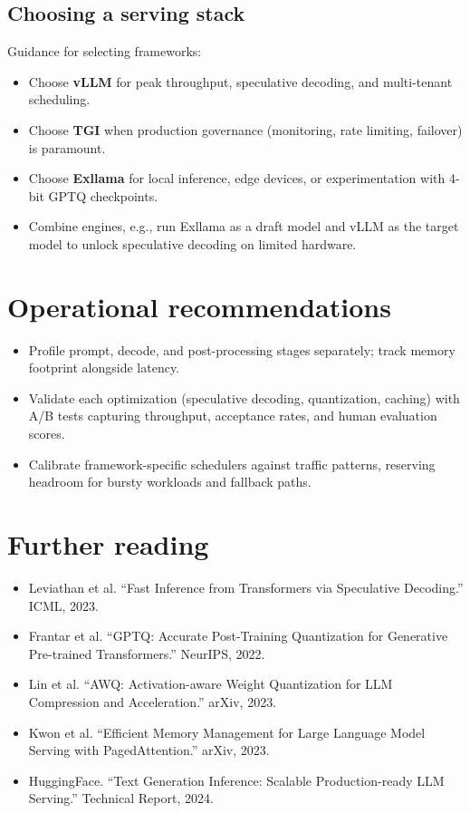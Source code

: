 \documentclass{article}
\begin{document}
\subsection{Choosing a serving stack}
Guidance for selecting frameworks:
\begin{itemize}
  \item Choose \textbf{vLLM} for peak throughput, speculative decoding, and multi-tenant scheduling.
  \item Choose \textbf{TGI} when production governance (monitoring, rate limiting, failover) is paramount.
  \item Choose \textbf{Exllama} for local inference, edge devices, or experimentation with 4-bit GPTQ checkpoints.
  \item Combine engines, e.g., run Exllama as a draft model and vLLM as the target model to unlock speculative decoding on limited hardware.
\end{itemize}

\section*{Operational recommendations}
\begin{itemize}
  \item Profile prompt, decode, and post-processing stages separately; track memory footprint alongside latency.
  \item Validate each optimization (speculative decoding, quantization, caching) with A/B tests capturing throughput, acceptance rates, and human evaluation scores.
  \item Calibrate framework-specific schedulers against traffic patterns, reserving headroom for bursty workloads and fallback paths.
\end{itemize}

\section*{Further reading}
\begin{itemize}
  \item Leviathan et al. ``Fast Inference from Transformers via Speculative Decoding.'' ICML, 2023.
  \item Frantar et al. ``GPTQ: Accurate Post-Training Quantization for Generative Pre-trained Transformers.'' NeurIPS, 2022.
  \item Lin et al. ``AWQ: Activation-aware Weight Quantization for LLM Compression and Acceleration.'' arXiv, 2023.
  \item Kwon et al. ``Efficient Memory Management for Large Language Model Serving with PagedAttention.'' arXiv, 2023.
  \item HuggingFace. ``Text Generation Inference: Scalable Production-ready LLM Serving.'' Technical Report, 2024.
\end{itemize}
\end{document}
